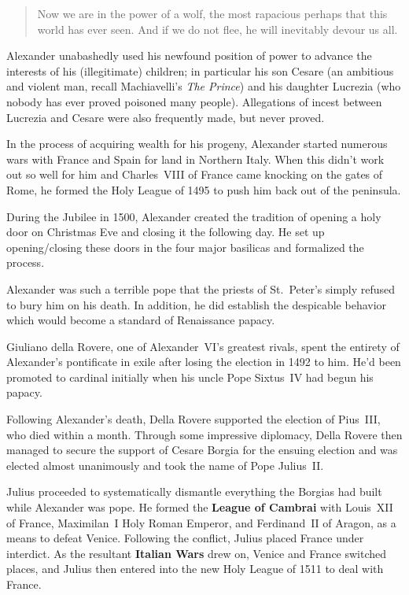 \begin{quote}
  Now we are in the power of a wolf, the most rapacious perhaps that this world has ever seen.
  And if we do not flee, he will inevitably devour us all.
\end{quote}

Alexander unabashedly used his newfound position of power
to advance the interests of his (illegitimate) children;
in particular his son Cesare
(an ambitious and violent man, recall Machiavelli's \textit{The Prince})
and his daughter Lucrezia (who nobody has ever proved poisoned many people).
Allegations of incest between Lucrezia and Cesare were also frequently made, but never proved.

In the process of acquiring wealth for his progeny,
Alexander started numerous wars with France and Spain for land in Northern Italy.
When this didn't work out so well for him
and Charles~VIII of France came knocking on the gates of Rome,
he formed the Holy League of 1495 to push him back out of the peninsula.

During the Jubilee in 1500,
Alexander created the tradition of opening a holy door on Christmas Eve
and closing it the following day.
He set up opening/closing these doors in the four major basilicas and formalized the process.

Alexander was such a terrible pope that the priests
of St.\ Peter's simply refused to bury him on his death.
In addition, he did establish the despicable behavior which would become a standard of Renaissance papacy.


Giuliano della Rovere, one of Alexander~VI's greatest rivals,
spent the entirety of Alexander's pontificate in exile after losing the election in 1492 to him.
He'd been promoted to cardinal initially when his uncle Pope Sixtus~IV had begun his papacy.

Following Alexander's death,
Della Rovere supported the election of Pius~III, who died within a month.
Through some impressive diplomacy,
Della Rovere then managed to secure the support of Cesare Borgia for the ensuing election
and was elected almost unanimously and took the name of Pope Julius~II\@.

Julius proceeded to systematically dismantle everything
the Borgias had built while Alexander was pope.
He formed the \textbf{League of Cambrai}
with Louis~XII of France, Maximilan~I Holy Roman Emperor, and Ferdinand~II of Aragon,
as a means to defeat Venice.
Following the conflict, Julius placed France under interdict.
As the resultant \textbf{Italian Wars} drew on, Venice and France switched places,
and Julius then entered into the new Holy League of 1511 to deal with France.

